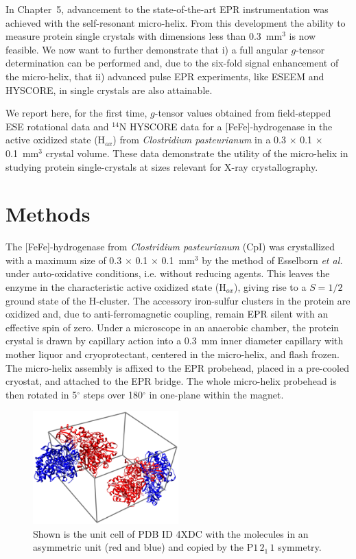 In Chapter~5, advancement to the state-of-the-art EPR instrumentation was achieved with the self-resonant micro-helix. From this development the ability to measure protein single crystals with dimensions less than 0.3~mm$^3$ is now feasible. We now want to further demonstrate that i) a full angular $g$-tensor determination can be performed and, due to the six-fold signal enhancement of the micro-helix, that ii) advanced pulse EPR experiments, like ESEEM and HYSCORE, in single crystals are also attainable. 

We report here, for the first time, $g$-tensor values obtained from field-stepped ESE rotational data and $^{14}$N HYSCORE data for a [FeFe]-hydrogenase in the active oxidized state (H$_{ox}$) from {\em Clostridium pasteurianum} in a 0.3 $\times$ 0.1 $\times$ 0.1~mm$^3$ crystal volume. These data demonstrate the utility of the micro-helix in studying protein single-crystals at sizes relevant for X-ray crystallography. 

\section{Methods}
The [FeFe]-hydrogenase from {\em Clostridium pasteurianum} (CpI) was crystallized with a maximum  size of 0.3 $\times$ 0.1 $\times$ 0.1~mm$^3$ by the method of Esselborn {\em et al.}\cite{FeFeCry} under auto-oxidative conditions, i.e. without reducing agents. This leaves the enzyme in the characteristic active oxidized state (H$_{ox}$), giving rise to a $S=1/2$ ground state of the H-cluster. The accessory iron-sulfur clusters in the protein are oxidized and, due to anti-ferromagnetic coupling, remain EPR silent with an effective spin of zero. \cite{lubitzhyd}  Under a microscope in an anaerobic chamber, the protein crystal is drawn by capillary action into a 0.3~mm inner diameter capillary with mother liquor and cryoprotectant, centered in the micro-helix, and flash frozen. The micro-helix assembly is affixed to the EPR probehead, placed in a pre-cooled cryostat, and attached to the EPR bridge. The whole micro-helix probehead is then rotated in 5$^{\circ}$ steps over 180$^{\circ}$ in one-plane within the magnet. 

\begin{figure}[htbp]
\centering
 \includegraphics[width=0.5\textwidth]{Kapitel/Ch6-Images/Ch6-UnitCell.eps}
 \caption[Unit Cell from PDB 4XDC.]{Shown is the unit cell of PDB ID 4XDC with the molecules in an asymmetric unit (red and blue) and copied by the P$1\,2_1\,1$ symmetry.} 
 \label{fig:xTalFeFeUnit}
\end{figure}


